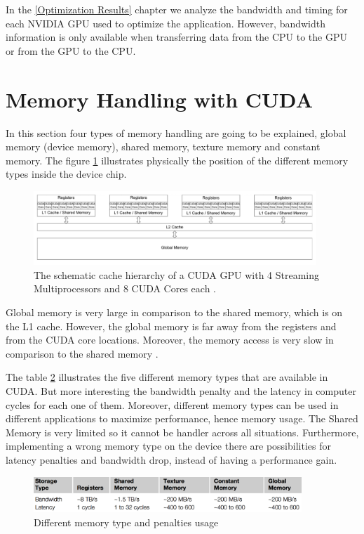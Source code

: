  In the \ref{Optimization Results} chapter we analyze the bandwidth and timing for each NVIDIA GPU used to optimize the application. However, bandwidth information is only available when transferring data from the CPU to the GPU or from the GPU to the CPU.

\section{Memory Handling with CUDA}

In this section four types of memory handling are going to be explained, global memory (device memory), shared memory, texture memory and constant memory. The figure \ref{fig:cores} illustrates physically the position of the different memory types inside the device chip.

\begin{figure}[htbp]
	\centering
		\includegraphics[width=0.95\textwidth]{Figures/cores.png}
		\smallskip
	\caption[Schematic cache hierarchy of a CUDA GPU]{The schematic cache hierarchy of a CUDA GPU with 4 Streaming Multiprocessors and 8 CUDA Cores each \cite{cook}.}
	\label{fig:cores}
\end{figure}

Global memory is very large in comparison to the shared memory, which is on the L1 cache. However, the global memory is far away from the registers and from the CUDA core locations. Moreover, the memory access is very slow in comparison to the shared memory \cite{cook}.

The table \ref{fig:memory} illustrates the five different memory types that are available in CUDA. But more interesting the bandwidth penalty and the latency in computer cycles for each one of them. Moreover, different memory types can be used in different applications to maximize performance, hence memory usage. The Shared Memory is very limited so it cannot be handler across all situations. Furthermore, implementing a wrong memory type on the device there are possibilities for latency penalties and bandwidth drop, instead of having a performance gain.
 
\begin{figure}[htbp]
	\centering
		\includegraphics[width=0.9\textwidth]{Figures/memory.png}
		\smallskip
	\caption[Different memory types]{Different memory type and penalties usage \cite{cook}}
	\label{fig:memory}
\end{figure}

